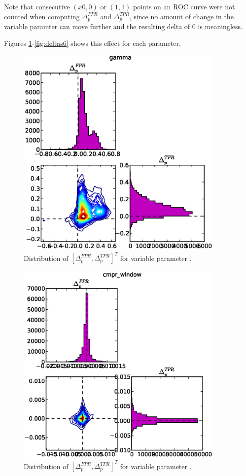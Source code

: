 Note that consecutive $(x0,0)$ or $(1,1)$ points on an ROC curve were not
counted when computing $\Delta_p^{FPR}$ and $\Delta_p^{TPR}$, since no amount of
change in the variable paramter can move further and the resulting delta of 0 is
meaningless.

Figures \ref{fig:deltas1}-\ref{fig:deltas6} shows this effect for each parameter.

\clearpage

\begin{figure}[!h]
\begin{center}
\includegraphics[width=4in]{../fig/final/delta_hist/gamma}
\end{center}
\caption{\label{fig:deltas1}  Distribution of $[\Delta_p^{FPR},\Delta_p^{TPR}]^T$
  for variable parameter .}
\end{figure}

\begin{figure}[!h]
\begin{center}
\includegraphics[width=4in]{../fig/final/delta_hist/cmpr_window}
\end{center}
\caption{\label{fig:deltas2}  Distribution of $[\Delta_p^{FPR},\Delta_p^{TPR}]^T$
  for variable parameter . }
\end{figure}

